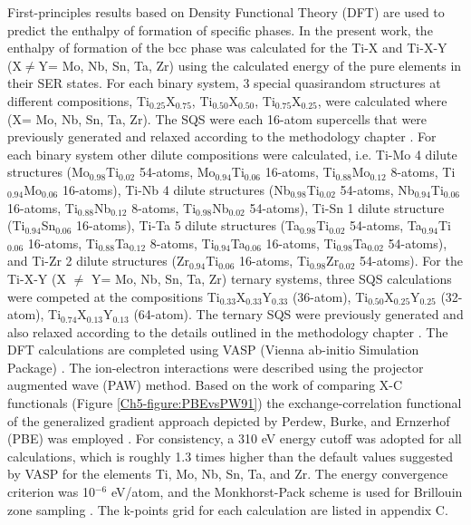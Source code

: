 First-principles results based on Density Functional Theory (DFT) are used to predict the enthalpy of formation of specific phases. In the present work, the enthalpy of formation of the bcc phase was calculated for the Ti-X and Ti-X-Y (X$\neq$Y= Mo, Nb, Sn, Ta, Zr) using the calculated energy of the pure elements in their SER states. For each binary system, 3 special quasirandom structures at different compositions, Ti$_{0.25}$X$_{0.75}$, Ti$_{0.50}$X$_{0.50}$, Ti$_{0.75}$X$_{0.25}$, were calculated where (X= Mo, Nb, Sn, Ta, Zr). The SQS were each 16-atom supercells that were previously generated and relaxed according to the methodology chapter \cite{Jiang2004}. For each binary system other dilute compositions were calculated, i.e. Ti-Mo 4 dilute structures (Mo$_{0.98}$Ti$_{0.02}$ 54-atoms, Mo$_{0.94}$Ti$_{0.06}$ 16-atoms,  Ti$_{0.88}$Mo$_{0.12}$ 8-atoms, Ti$_{0.94}$Mo$_{0.06}$ 16-atoms), Ti-Nb 4 dilute structures (Nb$_{0.98}$Ti$_{0.02}$ 54-atoms, Nb$_{0.94}$Ti$_{0.06}$ 16-atoms, Ti$_{0.88}$Nb$_{0.12}$ 8-atoms, Ti$_{0.98}$Nb$_{0.02}$ 54-atoms), Ti-Sn 1 dilute structure (Ti$_{0.94}$Sn$_{0.06}$ 16-atoms), Ti-Ta 5 dilute structures (Ta$_{0.98}$Ti$_{0.02}$ 54-atoms, Ta$_{0.94}$Ti$_{0.06}$ 16-atoms, Ti$_{0.88}$Ta$_{0.12}$ 8-atoms, Ti$_{0.94}$Ta$_{0.06}$ 16-atoms, Ti$_{0.98}$Ta$_{0.02}$ 54-atoms), and Ti-Zr 2 dilute structures (Zr$_{0.94}$Ti$_{0.06}$ 16-atoms, Ti$_{0.98}$Zr$_{0.02}$ 54-atoms). For the Ti-X-Y (X $\neq$ Y= Mo, Nb, Sn, Ta, Zr) ternary systems, three SQS calculations were competed at the compositions Ti$_{0.33}$X$_{0.33}$Y$_{0.33}$ (36-atom), Ti$_{0.50}$X$_{0.25}$Y$_{0.25}$ (32-atom), Ti$_{0.74}$X$_{0.13}$Y$_{0.13}$ (64-atom). The ternary SQS were previously generated and also relaxed according to the details outlined in the methodology chapter \cite{Jiang2009}. The DFT calculations are completed using VASP (Vienna ab-initio Simulation Package) \cite{Kresse1996}. The ion-electron interactions were described using the projector augmented wave (PAW) \cite{Kresse1999,Blochl1994} method. Based on the work of comparing X-C functionals (Figure \ref{Ch5-figure:PBEvsPW91}) the exchange-correlation functional of the generalized gradient approach depicted by Perdew, Burke, and Ernzerhof (PBE) was employed \cite{Perdew1996a}. For consistency, a 310 eV energy cutoff was adopted for all calculations, which is roughly 1.3 times higher than the default values suggested by VASP for the elements Ti, Mo, Nb, Sn, Ta, and Zr. The energy convergence criterion was 10$^{-6}$ eV/atom, and the Monkhorst-Pack scheme is used for Brillouin zone sampling \cite{Kresse1996,Monkhorst1976a}. The k-points grid for each calculation are listed in appendix C.

